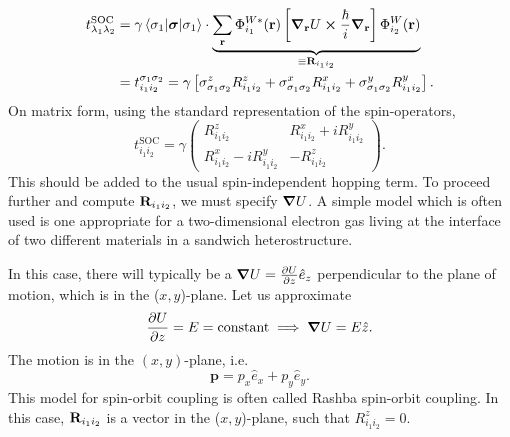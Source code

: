 \begin{align*}
	t_{\lambda_1\lambda_2}^{\text{SOC}} &= \gamma\mel{\sigma_1}{\bm{\sigma}}{\sigma_1} \cdot \underbrace{\sum_{\vb{r}}\Phi_{i_1}^{W*}(\vb r)\left [\grad_{\vb r}{U}\cross \frac{\hbar}{i}\grad_{\vb r} \right ]\Phi_{i_2}^{W}(\vb r)}_{\equiv \vb{R}_{i_1i_2}} \\
	&= t_{i_1i_2}^{\sigma_1\sigma_2} = \gamma \left [\sigma_{\sigma_1\sigma_2}^{z}R_{i_1i_2}^{z} + \sigma_{\sigma_1\sigma_2}^{x}R_{i_1i_2}^{x}+\sigma_{\sigma_1\sigma_2}^{y}R_{i_1i_2}^{y}\right ].
\end{align*}
On matrix form, using the standard representation of the spin-operators, 
\begin{equation}
	t_{i_1i_2}^{\text{SOC}} = \gamma \begin{pmatrix}
	R_{i_1i_2}^{z} & R_{i_1i_2}^{x} + iR_{i_1i_2}^{y} \\	R_{i_1i_2}^{x} - iR_{i_1i_2}^{y} & -R_{i_1i_2}^{z}
	\end{pmatrix}.
\end{equation}
This should be added to the usual spin-independent hopping term.
To proceed further and compute $\vb{R}_{i_1i_2}$, we must specify $\grad{U}$. 
A simple model which is often used is one appropriate for a two-dimensional electron gas living at the interface of two different materials in a sandwich heterostructure.
\begin{center}
\end{center}

In this case, there will typically be a $\grad{U} = \pdv{U}{z} \hat{e}_z$ perpendicular to the plane of motion, which is
in the ($x,y$)-plane. 
Let us approximate
\begin{equation}
	\pdv{U}{z} = E = \text{constant} \implies \grad{U} = E\hat{z}.
\end{equation}
The motion is in the $(x,y)$-plane, i.e.
\begin{equation}
	\bm{p} = p_x\hat{e}_x + p_y\hat{e}_y.
\end{equation}
This model for spin-orbit coupling is often called Rashba spin-orbit coupling. In this case, $\vb{R}_{i_1i_2}$ is a vector in the ($x,y$)-plane, such that $R_{i_1i_2}^{z} = 0$.


